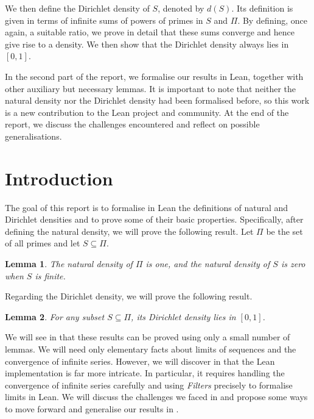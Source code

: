 \documentclass[a4paper,11pt]{article}
\theoremstyle{plain}
\newtheorem{lemma}[lemma]{Lemma}
\begin{document}
    We then define the Dirichlet density of $S$, denoted by $d(S)$. Its definition is given in terms of infinite sums of powers of primes in $S$ and $\Pi$. By defining, once again, a suitable ratio, we prove in detail that these sums converge and hence give rise to a density. We then show that the Dirichlet density always lies in $[0,1]$.
    
    In the second part of the report, we formalise our results in Lean, together with other auxiliary but necessary lemmas. It is important to note that neither the natural density nor the Dirichlet density had been formalised before, so this work is a new contribution to the Lean project and community. At the end of the report, we discuss the challenges encountered and reflect on possible generalisations.
	
	\vspace{0.5cm}
	
	\section{Introduction}
	
	The goal of this report is to formalise in Lean the definitions of natural and Dirichlet densities and to prove some of their basic properties. Specifically, after defining the natural density, we will prove the following result. Let $\Pi$ be the set of all primes and let $S\subseteq\Pi$.
	\begin{lemma}
        The natural density of $\Pi$ is one, and the natural density of $S$ is zero when $S$ is finite.
	\end{lemma}

    Regarding the Dirichlet density, we will prove the following result.
    \begin{lemma}
        For any subset $S\subseteq \Pi$, its Dirichlet density lies in $[0,1]$.
	\end{lemma}
	
	We will see in  that these results can be proved using only a small number of lemmas. We will need only elementary facts about limits of sequences and the convergence of infinite series. However, we will discover in  that the Lean implementation is far more intricate. In particular, it requires handling the convergence of infinite series carefully and using \emph{Filters} precisely to formalise limits in Lean. We will discuss the challenges we faced in  and propose some ways to move forward and generalise our results in .
	
\end{document}
